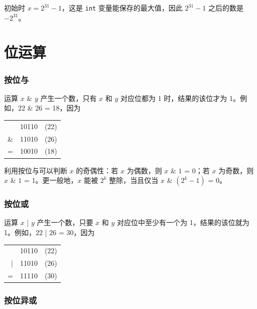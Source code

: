 初始时 $x=2^{31}-1$，这是 \texttt{int} 变量能保存的最大值，因此 $2^{31}-1$ 之后的数是 $-2^{31}$。


\section{位运算}

\newcommand\XOR{\mathbin{\char`\^}}

\subsubsection{按位与}


运算 $x$ \& $y$ 产生一个数，只有 $x$ 和 $y$ 对应位都为 1 时，结果的该位才为 1。例如，$22$ \& $26$ = 18，因为

\begin{center}
\begin{tabular}{rrr}
& 10110 & (22)\\
\& & 11010 & (26) \\
\hline
 = & 10010 & (18) \\
\end{tabular}
\end{center}

利用按位与可以判断 $x$ 的奇偶性：若 $x$ 为偶数，则 $x$ \& $1$ = 0；若 $x$ 为奇数，则 $x$ \& $1$ = 1。更一般地，$x$ 能被 $2^k$ 整除，当且仅当 $x$ \& $(2^k-1)$ = 0。

\subsubsection{按位或}


运算 $x$ | $y$ 产生一个数，只要 $x$ 和 $y$ 对应位中至少有一个为 1，结果的该位就为 1。例如，$22$ | $26$ = 30，因为

\begin{center}
\begin{tabular}{rrr}
& 10110 & (22)\\
| & 11010 & (26) \\
\hline
 = & 11110 & (30) \\
\end{tabular}
\end{center}

\subsubsection{按位异或}

